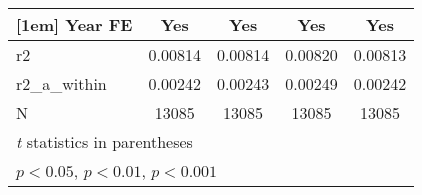 {\begin{tabular}{l*{4}{c}}
[1em]
Year FE     &         Yes         &         Yes         &         Yes         &         Yes         \\
\hline
r2          &     0.00814         &     0.00814         &     0.00820         &     0.00813         \\
r2\_a\_within &     0.00242         &     0.00243         &     0.00249         &     0.00242         \\
N           &       13085         &       13085         &       13085         &       13085         \\
\hline\hline
\multicolumn{5}{l}{\footnotesize \textit{t} statistics in parentheses}\\
\multicolumn{5}{l}{\footnotesize \sym{*} \(p<0.05\), \sym{**} \(p<0.01\), \sym{***} \(p<0.001\)}\\
\end{tabular}
}
